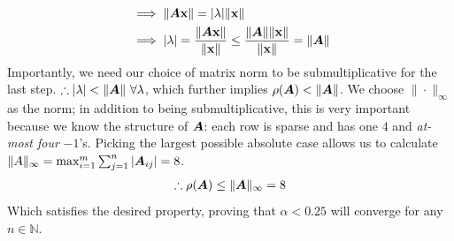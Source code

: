 \documentclass[]{exam}
\begin{document}
\begin{questions}
\begin{enumerate}[label=\arabic*.]
\begin{align*}
			&\implies \| \boldsymbol{A} \boldsymbol{\mathrm{x}} \| = |\lambda| \| \boldsymbol{\mathrm{x}} \| \\
			&\implies |\lambda| = \frac{\| \boldsymbol{A} \boldsymbol{\mathrm{x}} \|}{\| \boldsymbol{\mathrm{x}} \|} \leq \frac{\| \boldsymbol{A} \| \| \boldsymbol{\mathrm{x}} \|}{\| \boldsymbol{\mathrm{x}} \|} = \| \boldsymbol{A} \|
		\end{align*}
		Importantly, we need our choice of matrix norm to be submultiplicative for the last step.
		$\therefore |\lambda| < \|\boldsymbol{A}\|~\forall \lambda$, which further implies $\rho(\boldsymbol{A}) < \| \boldsymbol{A} \|$. We choose $\| \cdot \|_{\infty}$ as the norm; in addition to being submultiplicative, this is very important because we know the structure of $\boldsymbol{A}$: each row is sparse and has one $4$ and {\it at-most four} $-1$'s. Picking the largest possible absolute case allows us to calculate $\|A\|_{\infty} = \max^m_{i=1} \sum^n_{j=1} |\boldsymbol{A}_{ij}| = 8$.
		\begin{gather*}
			\therefore \rho(\boldsymbol{A}) \leq \| \boldsymbol{A} \|_{\infty} = 8
		\end{gather*}
		Which satisfies the desired property, proving that $\alpha < 0.25$ will converge for any $n \in \mathbb{N}$.
\end{enumerate}

\newpage
\question
\hfill



\end{questions}
\end{document}
